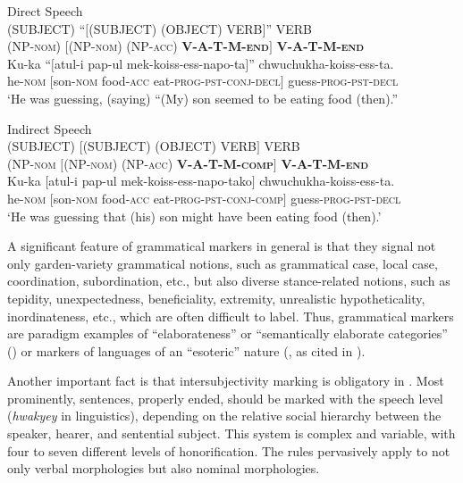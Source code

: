 \documentclass[output=paper,colorlinks,citecolor=brown]{langscibook}
\begin{document}
\ea \label{ex:RK2} \textup{Direct Speech} \\
\ea \label{ex:RK2a}
\gll \textup{(SUBJECT)} \textup{``$[$(SUBJECT)} \textup{(OBJECT)} \textup{VERB$]$''} \textup{VERB} \\
(NP-\textsc{nom}) $[$(NP-\textsc{nom}) (NP-\textsc{acc)} \textbf{V-A-T-M-\textsc{end}}$]$ \textbf{V-A-T-M-\textsc{end}} \\
\ex \label{ex:RK2b}
\gll Ku-ka \textup{``$[$}atul-i pap-ul mek-koiss-ess-napo-ta\textup{$]$''} chwuchukha-koiss-ess-ta. \\
he-\textsc{nom} $[$son-\textsc{nom} food-\textsc{acc} eat-\textsc{prog-pst-conj-decl}$]$ guess-\textsc{prog-pst-decl} \\
\glt `He was guessing, (saying) ``(My) son seemed to be eating food (then).''
\z
\z



\ea \label{ex:RK3} \textup{Indirect Speech} \\
\ea \label{ex:RK3a}
\gll \textup{(SUBJECT)} \textup{$[$(SUBJECT)} \textup{(OBJECT)} \textup{VERB$]$} \textup{VERB} \\
(NP-\textsc{nom} $[$(NP-\textsc{nom}) (NP-\textsc{acc}) \textbf{V-A-T-M-\textsc{comp}}$]$ \textbf{V-A-T-M-\textsc{end}} \\
\ex \label{ex:RK3b}
\gll Ku-ka $[$atul-i pap-ul mek-koiss-ess-napo-tako$]$ chwuchukha-koiss-ess-ta. \\
he-\textsc{nom} $[$son-\textsc{nom} food-\textsc{acc} eat-\textsc{prog-pst-conj-comp}$]$ guess-\textsc{prog-pst-decl} \\
\glt `He was guessing that (his) son might have been eating food (then).'
\z
\z


 A significant feature of  grammatical markers in general is that they signal not only garden-variety grammatical notions, such as grammatical case, local case, coordination, subordination, etc., but also diverse stance-related notions, such as tepidity, unexpectedness, beneficiality, extremity, unrealistic hypotheticality, inordinateness, etc., which are often difficult to label. Thus,  grammatical markers are paradigm examples of ``elaborateness'' or ``semantically elaborate categories'' (\citealt{Kuteva2009,kutevaetal2019}) or markers of languages of an ``esoteric'' nature (\citealt{Thurston1988,Grace1997,Crowley2000,WrayGrace2007}, as cited in \citealt{Rice2017,Rice2019}).

Another important fact is that intersubjectivity marking is obligatory in . Most prominently,  sentences, properly ended, should be marked with the speech level (\textit{hwakyey} in  linguistics), depending on the relative social hierarchy between the speaker, hearer, and sentential subject. This system is complex and variable, with four to seven different levels of honorification. The rules pervasively apply to not only verbal morphologies but also nominal morphologies.
\end{document}
